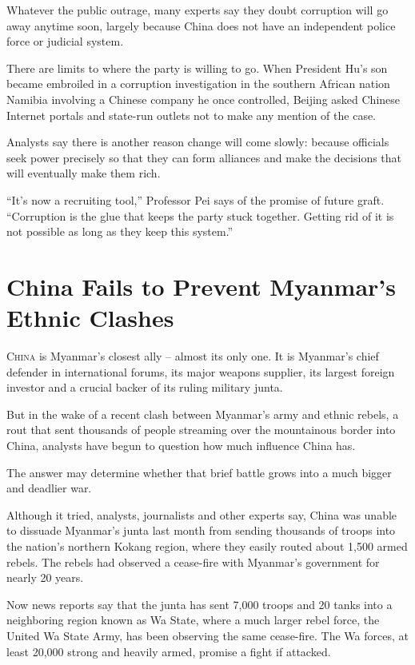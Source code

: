 ﻿\documentclass[12pt]{article}
\begin{document}
Whatever the public outrage, many experts say they doubt corruption will go away anytime soon,
largely because China does not have an independent police force or judicial system.

There are limits to where the party is willing to go. When President Hu's son became embroiled in a
corruption investigation in the southern African nation Namibia involving a Chinese company he once
controlled, Beijing asked Chinese Internet portals and state-run outlets not to make any mention of
the case.

Analysts say there is another reason change will come slowly: because officials seek power precisely
so that they can form alliances and make the decisions that will eventually make them rich.

``It's now a recruiting tool,'' Professor Pei says of the promise of future graft. ``Corruption is
the glue that keeps the party stuck together. Getting rid of it is not possible as long as they keep
this system.''

\section{China Fails to Prevent Myanmar's Ethnic Clashes}

\lettrine{C}{hina} is Myanmar's closest ally -- almost its only one. It is Myanmar's chief defender
in international forums, its major weapons supplier, its largest foreign investor and a crucial
backer of its ruling military junta.

But in the wake of a recent clash between Myanmar's army and ethnic rebels, a rout\cite{rout} that
sent thousands of people streaming over the mountainous border into China, analysts have begun to
question how much influence China has.

The answer may determine whether that brief battle grows into a much bigger and deadlier war.

Although it tried, analysts, journalists and other experts say, China was unable to dissuade
Myanmar's junta last month from sending thousands of troops into the nation's northern Kokang
region, where they easily routed about 1,500 armed rebels. The rebels had observed a cease-fire with
Myanmar's government for nearly 20 years.

Now news reports say that the junta has sent 7,000 troops and 20 tanks into a neighboring region
known as Wa State, where a much larger rebel force, the United Wa State Army, has been observing the
same cease-fire. The Wa forces, at least 20,000 strong and heavily armed, promise a fight if
attacked.
\end{document}
